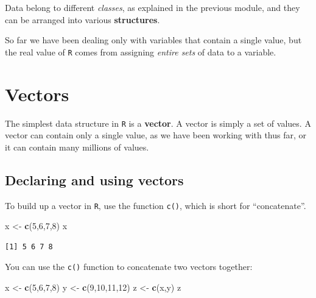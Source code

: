 \documentclass[
]{book}
\newenvironment{Shaded}{\begin{snugshade}}{\end{snugshade}}
\newcommand{\DecValTok}[1]{\textcolor[rgb]{0.00,0.00,0.81}{#1}}
\newcommand{\KeywordTok}[1]{\textcolor[rgb]{0.13,0.29,0.53}{\textbf{#1}}}
\newcommand{\NormalTok}[1]{#1}
\newcommand{\StringTok}[1]{\textcolor[rgb]{0.31,0.60,0.02}{#1}}
\begin{document}
Data belong to different \emph{classes}, as explained in the previous module, and they can be arranged into various \textbf{structures}.

So far we have been dealing only with variables that contain a single value, but the real value of \texttt{R} comes from assigning \emph{entire sets} of data to a variable.

\hypertarget{vectors}{%
\section*{Vectors}\label{vectors}}

The simplest data structure in \texttt{R} is a \textbf{vector}. A vector is simply a set of values. A vector can contain only a single value, as we have been working with thus far, or it can contain many millions of values.

\hypertarget{declaring-and-using-vectors}{%
\subsection*{Declaring and using vectors}\label{declaring-and-using-vectors}}

To build up a vector in \texttt{R}, use the function \texttt{c()}, which is short for ``concatenate''.

\begin{Shaded}
\begin{Highlighting}[]
\NormalTok{x <-}\StringTok{ }\KeywordTok{c}\NormalTok{(}\DecValTok{5}\NormalTok{,}\DecValTok{6}\NormalTok{,}\DecValTok{7}\NormalTok{,}\DecValTok{8}\NormalTok{)}
\NormalTok{x}
\end{Highlighting}
\end{Shaded}

\begin{verbatim}
[1] 5 6 7 8
\end{verbatim}

You can use the \texttt{c()} function to concatenate two vectors together:

\begin{Shaded}
\begin{Highlighting}[]
\NormalTok{x <-}\StringTok{ }\KeywordTok{c}\NormalTok{(}\DecValTok{5}\NormalTok{,}\DecValTok{6}\NormalTok{,}\DecValTok{7}\NormalTok{,}\DecValTok{8}\NormalTok{)}
\NormalTok{y <-}\StringTok{ }\KeywordTok{c}\NormalTok{(}\DecValTok{9}\NormalTok{,}\DecValTok{10}\NormalTok{,}\DecValTok{11}\NormalTok{,}\DecValTok{12}\NormalTok{)}
\NormalTok{z <-}\StringTok{ }\KeywordTok{c}\NormalTok{(x,y)}
\NormalTok{z}
\end{Highlighting}
\end{Shaded}
\end{document}
